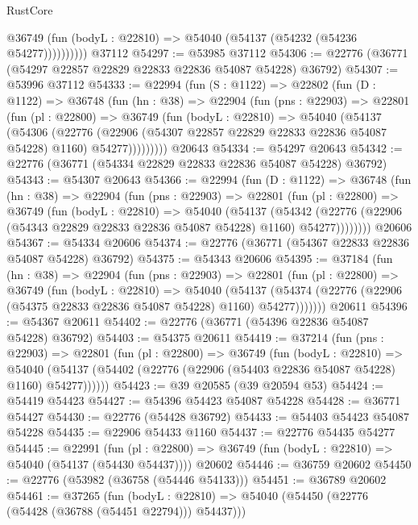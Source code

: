 \begin{lexlean}{RustCore}
\begin{coremodule}
              @36749 (fun (bodyL : @22810) => @54040 (@54137 (@54232 (@54236 @54277))))))))))
    @37112
@54297 := @53985 @37112
@54306 := @22776 (@36771 (@54297 @22857 @22829 @22833 @22836 @54087 @54228) @36792)
@54307 := @53996 @37112
@54333 := @22994
    (fun (S : @1122) =>
    @22802
      (fun (D : @1122) =>
      @36748
        (fun (hn : @38) =>
        @22904
          (fun (pns : @22903) =>
          @22801
            (fun (pl : @22800) =>
            @36749
              (fun (bodyL : @22810) =>
              @54040
                (@54137
                  (@54306
                    (@22776
                      (@22906 (@54307 @22857 @22829 @22833 @22836 @54087 @54228) @1160)
                      @54277)))))))))
    @20643
@54334 := @54297 @20643
@54342 := @22776 (@36771 (@54334 @22829 @22833 @22836 @54087 @54228) @36792)
@54343 := @54307 @20643
@54366 := @22994
    (fun (D : @1122) =>
    @36748
      (fun (hn : @38) =>
      @22904
        (fun (pns : @22903) =>
        @22801
          (fun (pl : @22800) =>
          @36749
            (fun (bodyL : @22810) =>
            @54040
              (@54137
                (@54342
                  (@22776 (@22906 (@54343 @22829 @22833 @22836 @54087 @54228) @1160) @54277))))))))
    @20606
@54367 := @54334 @20606
@54374 := @22776 (@36771 (@54367 @22833 @22836 @54087 @54228) @36792)
@54375 := @54343 @20606
@54395 := @37184
    (fun (hn : @38) =>
    @22904
      (fun (pns : @22903) =>
      @22801
        (fun (pl : @22800) =>
        @36749
          (fun (bodyL : @22810) =>
          @54040
            (@54137
              (@54374 (@22776 (@22906 (@54375 @22833 @22836 @54087 @54228) @1160) @54277)))))))
    @20611
@54396 := @54367 @20611
@54402 := @22776 (@36771 (@54396 @22836 @54087 @54228) @36792)
@54403 := @54375 @20611
@54419 := @37214
    (fun (pns : @22903) =>
    @22801
      (fun (pl : @22800) =>
      @36749
        (fun (bodyL : @22810) =>
        @54040 (@54137 (@54402 (@22776 (@22906 (@54403 @22836 @54087 @54228) @1160) @54277))))))
@54423 := @39 @20585 (@39 @20594 @53)
@54424 := @54419 @54423
@54427 := @54396 @54423 @54087 @54228
@54428 := @36771 @54427
@54430 := @22776 (@54428 @36792)
@54433 := @54403 @54423 @54087 @54228
@54435 := @22906 @54433 @1160
@54437 := @22776 @54435 @54277
@54445 := @22991
    (fun (pl : @22800) => @36749 (fun (bodyL : @22810) => @54040 (@54137 (@54430 @54437))))
    @20602
@54446 := @36759 @20602
@54450 := @22776 (@53982 (@36758 (@54446 @54133)))
@54451 := @36789 @20602
@54461 := @37265
    (fun (bodyL : @22810) => @54040 (@54450 (@22776 (@54428 (@36788 (@54451 @22794))) @54437)))

\end{coremodule}
\end{lexlean}
